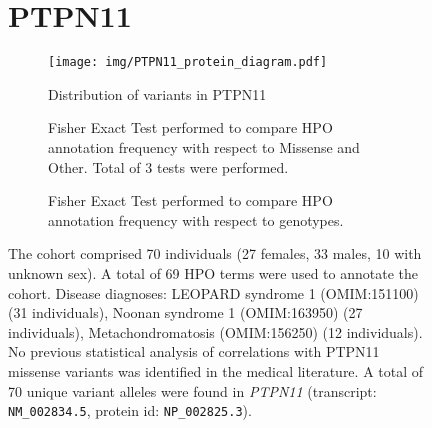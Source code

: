 \begin{figure}[htbp]
\section*{PTPN11}
\centering
\begin{subfigure}[b]{0.95\textwidth}
\centering
\texttt{[image:  img/PTPN11\_protein\_diagram.pdf]} 
\captionsetup{justification=raggedright,singlelinecheck=false}
\caption{Distribution of variants in PTPN11}
\end{subfigure}

\vspace{2em}

\begin{subfigure}[b]{0.95\textwidth}
\centering
{}
\captionsetup{justification=raggedright,singlelinecheck=false}
\caption{Fisher Exact Test performed to compare HPO annotation frequency with respect to Missense and Other. Total of 3 tests were performed.}
\end{subfigure}
\vspace{2em}
\begin{subfigure}[b]{0.95\textwidth}
\centering
{}
\captionsetup{justification=raggedright,singlelinecheck=false}
\caption{Fisher Exact Test performed to compare HPO annotation frequency with respect to genotypes.}
\end{subfigure}

\vspace{2em}

\caption{The cohort comprised 70 individuals (27 females, 33 males, 10 with unknown sex). A total of 69 HPO terms were used to annotate the cohort. Disease diagnoses: LEOPARD syndrome 1 (OMIM:151100) (31 individuals), Noonan syndrome 1 (OMIM:163950) (27 individuals), Metachondromatosis (OMIM:156250) (12 individuals). No previous statistical analysis of correlations with PTPN11 missense variants was identified in the medical literature. A total of 70 unique variant alleles were found in \textit{PTPN11} (transcript: \texttt{NM\_002834.5}, protein id: \texttt{NP\_002825.3}).}
\end{figure}
